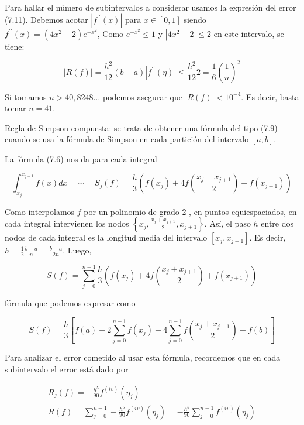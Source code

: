 \documentclass[10pt]{article}
\begin{document}
Para hallar el número de subintervalos a considerar usamos la expresión del error (7.11). Debemos acotar $\left|f^{\prime \prime}(x)\right|$ para $x \in[0,1]$ siendo $f^{\prime \prime}(x)=\left(4 x^{2}-2\right) e^{-x^{2}}$, Como $e^{-x^{2}} \leq 1$ y $\left|4 x^{2}-2\right| \leq 2$ en este intervalo, se tiene:

$$
|R(f)|=\frac{h^{2}}{12}(b-a)\left|f^{\prime \prime}(\eta)\right| \leq \frac{h^{2}}{12} 2=\frac{1}{6}\left(\frac{1}{n}\right)^{2}
$$

Si tomamos $n>40,8248 \ldots$ podemos asegurar que $|R(f)|<10^{-4}$. Es decir, basta tomar $n=41$.

Regla de Simpson compuesta: se trata de obtener una fórmula del tipo (7.9) cuando se usa la fórmula de Simpson en cada partición del intervalo $[a, b]$.

La fórmula (7.6) nos da para cada integral

$$
\int_{x_{j}}^{x_{j+1}} f(x) d x \quad \sim \quad S_{j}(f)=\frac{h}{3}\left(f\left(x_{j}\right)+4 f\left(\frac{x_{j}+x_{j+1}}{2}\right)+f\left(x_{j+1}\right)\right)
$$

Como interpolamos $f$ por un polinomio de grado 2 , en puntos equiespaciados, en cada integral intervienen los nodos $\left\{x_{j}, \frac{x_{j}+x_{j+1}}{2}, x_{j+1}\right\}$. Así, el paso $h$ entre dos nodos de cada integral es la longitud media del intervalo $\left[x_{j}, x_{j+1}\right]$. Es decir, $h=\frac{1}{2} \frac{b-a}{n}=\frac{b-a}{2 n}$. Luego,

$$
S(f)=\sum_{j=0}^{n-1} \frac{h}{3}\left(f\left(x_{j}\right)+4 f\left(\frac{x_{j}+x_{j+1}}{2}\right)+f\left(x_{j+1}\right)\right)
$$

fórmula que podemos expresar como


\begin{equation*}
S(f)=\frac{h}{3}\left[f(a)+2 \sum_{j=0}^{n-1} f\left(x_{j}\right)+4 \sum_{j=0}^{n-1} f\left(\frac{x_{j}+x_{j+1}}{2}\right)+f(b)\right] \tag{7.12}
\end{equation*}


Para analizar el error cometido al usar esta fórmula, recordemos que en cada subintervalo el error está dado por

$$
\begin{gathered}
R_{j}(f)=-\frac{h^{5}}{90} f^{(i v)}\left(\eta_{j}\right) \\
R(f)=\sum_{j=0}^{n-1}-\frac{h^{5}}{90} f^{(i v)}\left(\eta_{j}\right)=-\frac{h^{5}}{90} \sum_{j=0}^{n-1} f^{(i v)}\left(\eta_{j}\right)
\end{gathered}
$$
\end{document}

